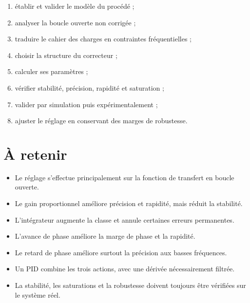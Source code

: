 \begin{enumerate}
  \item établir et valider le modèle du procédé ;
  \item analyser la boucle ouverte non corrigée ;
  \item traduire le cahier des charges en contraintes fréquentielles ;
  \item choisir la structure du correcteur ;
  \item calculer ses paramètres ;
  \item vérifier stabilité, précision, rapidité et saturation ;
  \item valider par simulation puis expérimentalement ;
  \item ajuster le réglage en conservant des marges de robustesse.
\end{enumerate}

\section{À retenir}\label{sec:corr-retenir}

\begin{itemize}
  \item Le réglage s'effectue principalement sur la fonction de transfert en boucle ouverte.
  \item Le gain proportionnel améliore précision et rapidité, mais réduit la stabilité.
  \item L'intégrateur augmente la classe et annule certaines erreurs permanentes.
  \item L'avance de phase améliore la marge de phase et la rapidité.
  \item Le retard de phase améliore surtout la précision aux basses fréquences.
  \item Un PID combine les trois actions, avec une dérivée nécessairement filtrée.
  \item La stabilité, les saturations et la robustesse doivent toujours être vérifiées sur le système réel.
\end{itemize}
